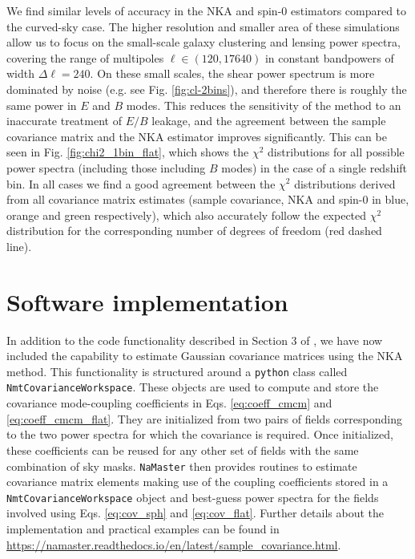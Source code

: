 \documentclass[a4paper,11pt]{article}
\begin{document}
    We find similar levels of accuracy in the NKA and spin-0 estimators compared to the curved-sky case. The higher resolution and smaller area of these simulations allow us to focus on the small-scale galaxy clustering and lensing power spectra, covering the range of multipoles $\ell\in(120,17640)$ in constant bandpowers of width $\Delta \ell=240$. On these small scales, the shear power spectrum is more dominated by noise (e.g. see Fig. \ref{fig:cl-2bins}), and therefore there is roughly the same power in $E$ and $B$ modes. This reduces the sensitivity of the method to an inaccurate treatment of $E/B$ leakage, and the agreement between the sample covariance matrix and the NKA estimator improves significantly. This can be seen in Fig. \ref{fig:chi2_1bin_flat}, which shows the $\chi^2$ distributions for all possible power spectra (including those including $B$ modes) in the case of a single redshift bin. In all cases we find a good agreement between the $\chi^2$ distributions derived from all covariance matrix estimates (sample covariance, NKA and spin-0 in blue, orange and green respectively), which also accurately follow the expected $\chi^2$ distribution for the corresponding number of degrees of freedom (red dashed line).
    
  \section{Software implementation}\label{app:namaster}
    In addition to the code functionality described in Section 3 of \cite{2019MNRAS.484.4127A}, we have now included the capability to estimate Gaussian covariance matrices using the NKA method. This functionality is structured around a {\tt python} class called {\tt NmtCovarianceWorkspace}. These objects are used to compute and store the covariance mode-coupling coefficients in Eqs. \ref{eq:coeff_cmcm} and \ref{eq:coeff_cmcm_flat}. They are initialized from two pairs of fields corresponding to the two power spectra for which the covariance is required. Once initialized, these coefficients can be reused for any other set of fields with the same combination of sky masks. {\tt NaMaster} then provides routines to estimate covariance matrix elements making use of the coupling coefficients stored in a {\tt NmtCovarianceWorkspace} object and best-guess power spectra for the fields involved using Eqs. \ref{eq:cov_sph} and \ref{eq:cov_flat}. Further details about the implementation and practical examples can be found in \url{https://namaster.readthedocs.io/en/latest/sample_covariance.html}.

  
  
\end{document}

